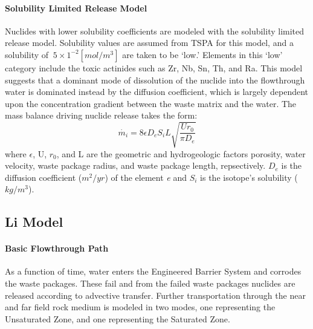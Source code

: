 \paragraph{Solubility Limited Release Model}
Nuclides with lower solubility coefficients are modeled with the solubility limited release model. Solubility values are assumed from TSPA for this model, and a solubility of $~5\times 1^{-2} [mol/m^3]$ are taken to be `low.' Elements in this `low' category include the toxic actinides such as Zr, Nb, Sn, Th, and Ra. This model suggests that a dominant mode of dissolution of the nuclide into the flowthrough water is dominated instead by the diffusion coefficient, which is largely dependent upon the concentration gradient between the waste matrix and the water. The mass balance driving nuclide release takes the form:
\begin{equation}
\dot{m_i}=8\epsilon D_eS_iL\sqrt{\frac{Ur_0}{\pi D_e}}
\end{equation}
where $\epsilon$, U, $r_0$, and L are the geometric and hydrogeologic factors porosity, water velocity, waste package radius, and waste package length, repsectively. $D_e$ is the diffusion coefficient ($m^2/yr$) of the element \emph{e} and $S_i$ is the isotope's solubility ($kg/m^3$).

\subsection{Li Model\cite{Jun}}
\paragraph{Basic Flowthrough Path}
As a function of time, water enters the Engineered Barrier System and corrodes the waste packages. These fail and from the failed waste packages nuclides are released according to advective transfer. Further transportation through the near and far field rock medium is modeled in two modes, one representing the Unsaturated Zone, and one representing the Saturated Zone.

